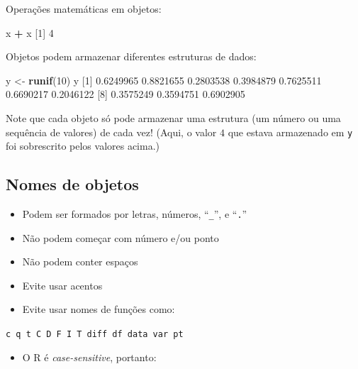 \documentclass[10pt,a4paper]{book}
\newenvironment{Shaded}{\begin{snugshade}}{\end{snugshade}}
\newcommand{\KeywordTok}[1]{\textcolor[rgb]{0.13,0.29,0.53}{\textbf{#1}}}
\newcommand{\DecValTok}[1]{\textcolor[rgb]{0.00,0.00,0.81}{#1}}
\newcommand{\FloatTok}[1]{\textcolor[rgb]{0.00,0.00,0.81}{#1}}
\newcommand{\StringTok}[1]{\textcolor[rgb]{0.31,0.60,0.02}{#1}}
\newcommand{\OperatorTok}[1]{\textcolor[rgb]{0.81,0.36,0.00}{\textbf{#1}}}
\newcommand{\NormalTok}[1]{#1}
\providecommand{\tightlist}{%
  \setlength{\itemsep}{0pt}\setlength{\parskip}{0pt}}
\begin{document}
Operações matemáticas em objetos:

\begin{Shaded}
\begin{Highlighting}[]
\NormalTok{x }\OperatorTok{+}\StringTok{ }\NormalTok{x}
\NormalTok{[}\DecValTok{1}\NormalTok{] }\DecValTok{4}
\end{Highlighting}
\end{Shaded}

Objetos podem armazenar diferentes estruturas de dados:

\begin{Shaded}
\begin{Highlighting}[]
\NormalTok{y <-}\StringTok{ }\KeywordTok{runif}\NormalTok{(}\DecValTok{10}\NormalTok{)}
\NormalTok{y}
\NormalTok{ [}\DecValTok{1}\NormalTok{] }\FloatTok{0.6249965} \FloatTok{0.8821655} \FloatTok{0.2803538} \FloatTok{0.3984879} \FloatTok{0.7625511} \FloatTok{0.6690217} \FloatTok{0.2046122}
\NormalTok{ [}\DecValTok{8}\NormalTok{] }\FloatTok{0.3575249} \FloatTok{0.3594751} \FloatTok{0.6902905}
\end{Highlighting}
\end{Shaded}

Note que cada objeto só pode armazenar uma estrutura (um número ou uma
sequência de valores) de cada vez! (Aqui, o valor \(4\) que estava
armazenado em \texttt{y} foi sobrescrito pelos valores acima.)

\subsection{Nomes de objetos}\label{nomes-de-objetos}

\begin{itemize}
\tightlist
\item
  Podem ser formados por letras, números, ``\texttt{\_}'', e
  ``\texttt{.}''
\item
  Não podem começar com número e/ou ponto
\item
  Não podem conter espaços
\item
  Evite usar acentos
\item
  Evite usar nomes de funções como:
\end{itemize}

\texttt{c\ q\ t\ C\ D\ F\ I\ T\ diff\ df\ data\ var\ pt}

\begin{itemize}
\tightlist
\item
  O R é \emph{case-sensitive}, portanto:
\end{itemize}
\end{document}
